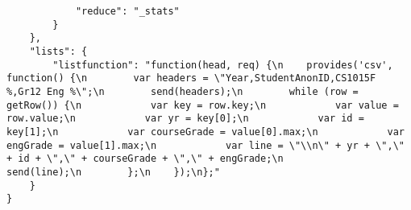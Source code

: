 \begin{verbatim}
            "reduce": "_stats"
        }
    },
    "lists": {
        "listfunction": "function(head, req) {\n    provides('csv', function() {\n        var headers = \"Year,StudentAnonID,CS1015F %,Gr12 Eng %\";\n        send(headers);\n        while (row = getRow()) {\n            var key = row.key;\n            var value = row.value;\n            var yr = key[0];\n            var id = key[1];\n            var courseGrade = value[0].max;\n            var engGrade = value[1].max;\n            var line = \"\\n\" + yr + \",\" + id + \",\" + courseGrade + \",\" + engGrade;\n            send(line);\n        };\n    });\n};"
    }
}
\end{verbatim}